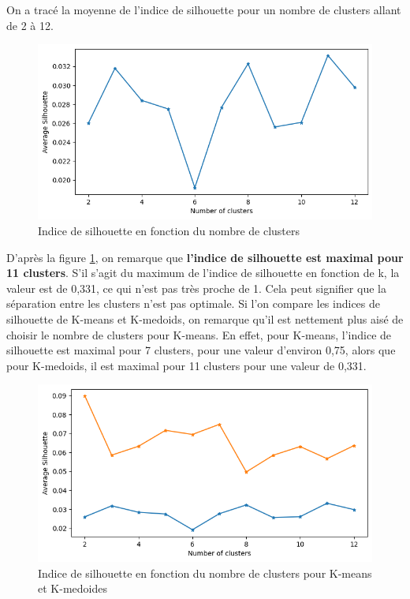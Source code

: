 \documentclass[french,a4paper,18pt]{article}
\begin{document}
On a tracé la moyenne de l'indice de silhouette pour un nombre de clusters allant de 2 à 12.

\begin{figure}[h!]
    \centering
    \includegraphics[scale=0.4]{images/mnist_kmedoids_silhouette.png}
    \caption{Indice de silhouette en fonction du nombre de clusters}\label{fig:mnist_kmedoids_silhouette}
\end{figure}

D'après la figure \ref{fig:mnist_kmedoids_silhouette}, on remarque que \textbf{l'indice de silhouette est maximal pour 11 clusters}.
S'il s'agit du maximum de l'indice de silhouette en fonction de k, la valeur est de 0,331, ce qui n'est pas très proche de 1.
Cela peut signifier que la séparation entre les clusters n'est pas optimale.
Si l'on compare les indices de silhouette de K-means et K-medoids, on remarque qu'il est nettement plus aisé de choisir le nombre de clusters pour K-means.
En effet, pour K-means, l'indice de silhouette est maximal pour 7 clusters, pour une valeur d'environ 0,75, alors que pour K-medoids, il est maximal pour 11 clusters pour une valeur de 0,331.

\begin{figure}[h!]
    \centering
    \includegraphics[scale=0.4]{images/mnist_comparison_silhouette.png}
    \caption{Indice de silhouette en fonction du nombre de clusters pour K-means et K-medoides}\label{fig:mnist_comparison_silhouette}
\end{figure}
\end{document}
